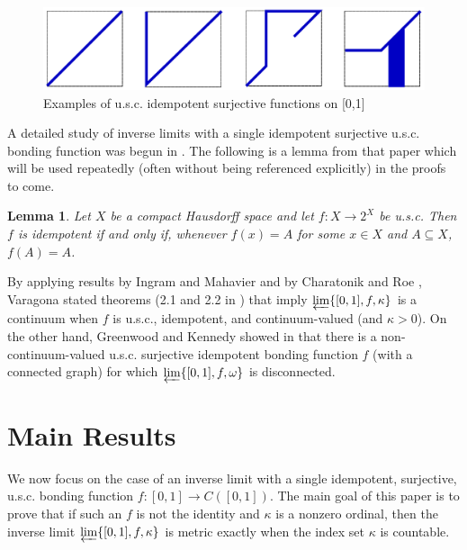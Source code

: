 \documentclass{amsart}
\newtheorem{lemma}[theorem]{Lemma}
\theoremstyle{definition}
\begin{document}
\begin{figure}
\begin{center}
\includegraphics[width=\linewidth]{idempotent_usc.pdf}
\end{center}
\caption{Examples of u.s.c. idempotent surjective functions on [0,1]}
\label{idempotentUsc}
\end{figure}

A detailed study of inverse limits with a single idempotent surjective u.s.c. bonding function was begun in \cite{varagona}. The following is a lemma from that paper which will be used repeatedly (often without being referenced explicitly) in the proofs to come.

\begin{lemma} \label{idemlemma}  Let $X$ be a compact Hausdorff space and let $f: X \rightarrow 2^{X}$ be u.s.c. Then $f$ is idempotent if and only if, whenever $f(x) = A$ for some $x \in X$ and $A \subseteq X$, $f(A) = A$.
\end{lemma}

By applying results by Ingram and Mahavier \cite{ingram mahavier} and by Charatonik and Roe \cite{char roe}, Varagona stated theorems (2.1 and 2.2 in \cite{varagona}) that imply $\varprojlim \{[0,1], f, \kappa\}$ is a continuum when $f$ is u.s.c., idempotent, and continuum-valued (and $\kappa > 0$). On the other hand, Greenwood and Kennedy showed in \cite{greenwood kennedy} that there is a non-continuum-valued u.s.c. surjective idempotent bonding function $f$ (with a connected graph) for which $\varprojlim \{[0,1], f, \omega\}$ is disconnected.

\section{Main Results}

We now focus on the case of an inverse limit with a single idempotent, surjective, u.s.c. bonding function $f: [0,1] \rightarrow C([0,1])$. The main goal of this paper is to prove that if such an $f$ is not the identity and $\kappa$ is a nonzero ordinal, then the inverse limit $\varprojlim \{[0,1], f, \kappa\}$ is metric exactly when the index set $\kappa$ is countable.
\end{document}
